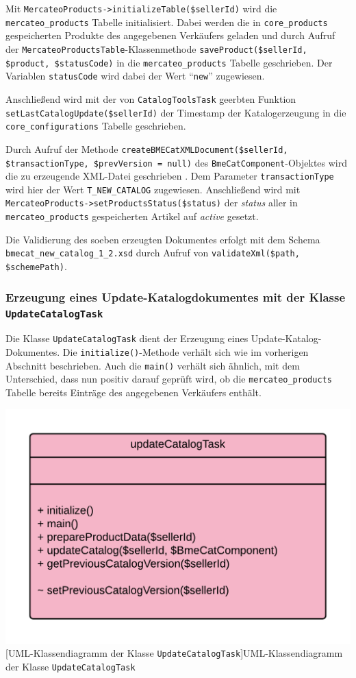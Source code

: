 	
	Mit \texttt{MercateoProducts->initializeTable(\$sellerId)} wird die \texttt{mercateo\_products} Tabelle initialisiert. Dabei werden die in \texttt{core\_products} gespeicherten Produkte des angegebenen Verkäufers geladen und durch Aufruf der \texttt{MercateoProductsTable}-Klassenmethode  \texttt{saveProduct(\$sellerId, \$product, \$statusCode)} in die \texttt{mercateo\_products} Tabelle geschrieben. Der Variablen \texttt{statusCode} wird dabei der Wert \enquote{\texttt{new}} zugewiesen. 
	
	Anschließend wird mit der von \texttt{CatalogToolsTask} geerbten Funktion \texttt{setLastCatalogUpdate(\$sellerId)} der Timestamp der Katalogerzeugung in die \texttt{core\_configurations} Tabelle geschrieben.
		
	Durch Aufruf der Methode \texttt{createBMECatXMLDocument(\$sellerId, \$transactionType, \$prevVersion = null)} des \texttt{BmeCatComponent}-Objektes wird die zu erzeugende XML-Datei geschrieben . Dem Parameter \texttt{transactionType} wird hier der Wert \texttt{T\_NEW\_CATALOG} zugewiesen. Anschließend wird mit \texttt{MercateoProducts->setProductsStatus(\$status)}  der \textit{status} aller in \texttt{mercateo\_products} gespeicherten Artikel auf \textit{active} gesetzt.

	Die Validierung des soeben erzeugten Dokumentes erfolgt mit dem Schema \texttt{bmecat\_new\_catalog\_1\_2.xsd} durch Aufruf von \texttt{validateXml(\$path, \$schemePath)}.
	
	
	
	\subsubsection{Erzeugung eines Update-Katalogdokumentes  mit der Klasse \texttt{UpdateCatalogTask}}
	
	Die Klasse \texttt{UpdateCatalogTask} dient der Erzeugung eines Update-Katalog-Dokumentes. Die \texttt{initialize()}-Methode verhält sich wie im vorherigen Abschnitt beschrieben. Auch die \texttt{main()} verhält sich ähnlich, mit dem Unterschied, dass nun positiv darauf geprüft wird, ob die \texttt{mercateo\_products} Tabelle bereits Einträge des angegebenen Verkäufers enthält. \\
	\begin{minipage}{\linewidth}
		\vspace{1em}
		\centering
		\includegraphics[width=0.6 \linewidth]{img/UpdateCatalogTaskUML}
		[UML-Klassendiagramm der Klasse \texttt{UpdateCatalogTask}]{UML-Klassendiagramm der Klasse \texttt{UpdateCatalogTask}}
		\vspace{1em}
	\end{minipage}
	
